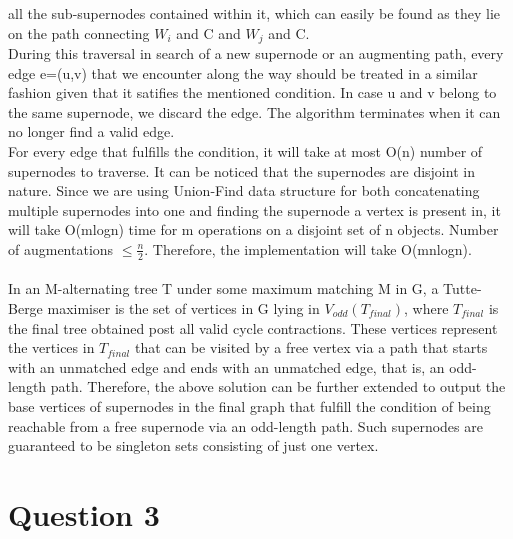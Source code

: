 \documentclass[12pt]{article}
\begin{document}
all the sub-supernodes contained within it, which can easily be 
found as they lie on the path connecting $W_i$ and C and $W_j$ and C. \\
During this 
traversal in search of a new supernode or an augmenting path, every edge e=(u,v) that we encounter 
along the way should be treated in a similar fashion given that it satifies the mentioned condition. 
In case u and v belong to the same supernode, we discard the edge. The algorithm terminates 
when it can no longer find a valid edge. 
\\
For every edge that fulfills the condition, it will take at most 
O(n) number of supernodes to traverse. It can be noticed that the supernodes 
are disjoint in nature. Since we are using Union-Find 
data structure for both concatenating multiple supernodes into one and 
finding the supernode a vertex is present in, it will take O(mlogn) time 
for m operations on a disjoint set of n objects. Number of augmentations 
$\le \frac{n}{2}$. Therefore, the implementation will take 
O(mnlogn). \\ \\

In an M-alternating tree T under some maximum matching M in G,
a Tutte-Berge maximiser is the set of vertices in G lying 
in $V_{odd}(T_{final})$, where $T_{final}$ is the final tree
obtained post all valid cycle contractions. These vertices represent the vertices in 
$T_{final}$ that can be visited by a 
free vertex via a path that starts with an unmatched edge 
and ends with an unmatched edge, that is, an odd-length path. Therefore, 
the above solution can be further extended to output the base vertices of supernodes in the 
final graph that fulfill 
the condition of being reachable from a free supernode via an odd-length path.
Such supernodes are guaranteed to be singleton sets consisting of 
just one vertex. 

\newpage 

\section{Question 3}
\end{document}
